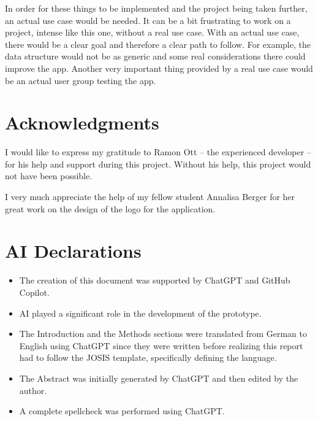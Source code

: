 \documentclass{josis}
\begin{document}
In order for these things to be implemented and the project being taken further, an actual use case would be needed.
It can be a bit frustrating to work on a project, intense like this one, without a real use case.
With an actual use case, there would be a clear goal and therefore a clear path to follow. For example, the
data structure would not be as generic and some real considerations there could improve the app.
Another very important thing provided by a real use case would be an actual user group testing the app.

\section*{Acknowledgments}

I would like to express my gratitude to Ramon Ott -- the experienced developer -- for his help and support during this project. 
Without his help, this project would not have been possible.

I very much appreciate the help of my fellow student Annalisa Berger for her great work on the design of the logo for the application.

\section*{AI Declarations}

\begin{itemize}
    \item The creation of this document was supported by ChatGPT and GitHub Copilot.
    \item AI played a significant role in the development of the prototype.
    \item The Introduction and the Methods sections were translated from German to English using ChatGPT 
        since they were written before realizing this report had to follow the JOSIS template, specifically defining the language.
    \item The Abstract was initially generated by ChatGPT and then edited by the author.
    \item A complete spellcheck was performed using ChatGPT.
\end{itemize}



\end{document}
